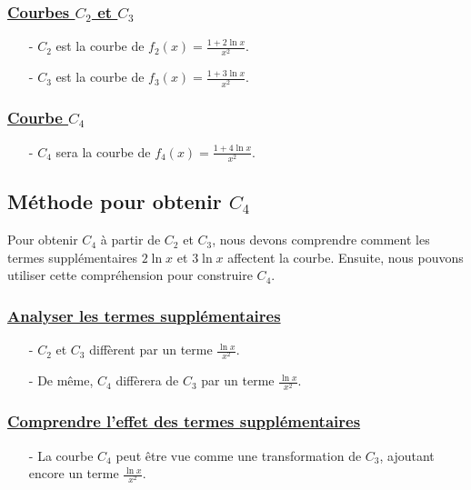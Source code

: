 \documentclass[12pt]{article}
\begin{document}
\begin{enumerate}
\subsubsection*{\underline{ Courbes \(C_2\) et \(C_3\)}}
\begin{itemize}
    \item[-] \( C_2 \) est la courbe de \( f_2(x) = \frac{1 + 2 \ln x}{x^2} \).
    \item[-] \( C_3 \) est la courbe de \( f_3(x) = \frac{1 + 3 \ln x}{x^2} \).
\end{itemize}

\subsubsection*{\underline{ Courbe \(C_4\)}}
\begin{itemize}
    \item[-] \( C_4 \) sera la courbe de \( f_4(x) = \frac{1 + 4 \ln x}{x^2} \).
\end{itemize}

\subsection*{Méthode pour obtenir \(C_4\)}

Pour obtenir \( C_4 \) à partir de \( C_2 \) et \( C_3 \), nous devons comprendre comment les termes supplémentaires \( 2 \ln x \) et \( 3 \ln x \) affectent la courbe. Ensuite, nous pouvons utiliser cette compréhension pour construire \( C_4 \).

\subsubsection*{\underline{ Analyser les termes supplémentaires }}
\begin{itemize}
    \item[-] \( C_2 \) et \( C_3 \) diffèrent par un terme \(\frac{\ln x}{x^2}\).
    \item[-] De même, \( C_4 \) diffèrera de \( C_3 \) par un terme \(\frac{\ln x}{x^2}\).
\end{itemize}

\subsubsection*{\underline{  Comprendre l'effet des termes supplémentaires }}
\begin{itemize}
    \item[-] La courbe \( C_4 \) peut être vue comme une transformation de \( C_3 \), ajoutant encore un terme \(\frac{\ln x}{x^2}\).
\end{itemize}


\end{enumerate}
\end{document}
